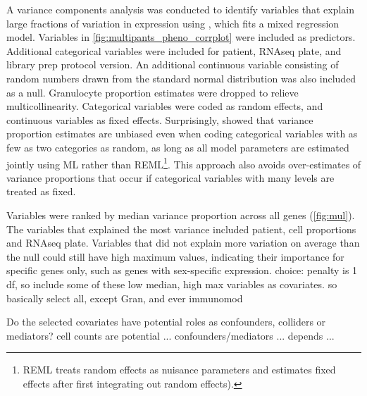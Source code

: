 \begin{outline}
A variance components analysis was conducted to identify variables that explain large fractions of variation in expression
using \autocite{hoffman2016VariancePartitionInterpretingDrivers}, which fits a mixed regression model.
Variables in \autoref{fig:multipants_pheno_corrplot} were included as predictors.
Additional categorical variables were included for patient, \gls{RNAseq} plate, and library prep protocol version.
An additional continuous variable consisting of random numbers drawn from the standard normal distribution was also included as a null.
Granulocyte proportion estimates were dropped to relieve multicollinearity.
Categorical variables were coded as random effects, and continuous variables as fixed effects.
Surprisingly, \textcite{hoffman2016VariancePartitionInterpretingDrivers} showed that variance proportion estimates are unbiased even when coding categorical variables with as few as two categories as random, 
as long as all model parameters are estimated jointly using \gls{ML} rather than \gls{REML}\footnote{
    \gls{REML} treats random effects as nuisance parameters and estimates fixed effects after first integrating out random effects).
}.
This approach also avoids over-estimates of variance proportions that occur if categorical variables with many levels are treated as fixed.

\1 Variables were ranked by median variance proportion across all genes (\autoref{fig:mul}).
The variables that explained the most variance included patient, cell proportions and \gls{RNAseq} plate.
Variables that did not explain more variation on average than the null could still have high maximum values, 
indicating their importance for specific genes only, such as genes with sex-specific expression.
    \2 choice: penalty is 1 df, so include some of these low median, high max variables as covariates.
    \2 so basically select all, except Gran, and ever immunomod

\1 Do the selected covariates have potential roles as confounders, colliders or mediators?
    \2 cell counts are potential ... confounders/mediators ... depends ...



\end{outline}
